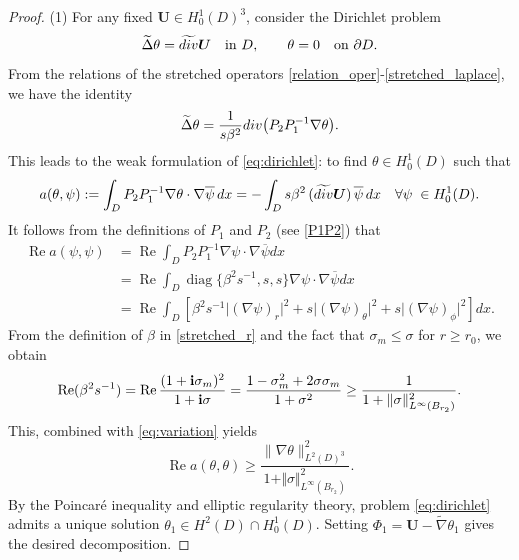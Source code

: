 \documentclass[10pt,a4paper]{amsart}
\providecommand{\Diag}{\operatorname{diag}}%
\providecommand{\Rp}{\operatorname{Re}}%
\newcommand{\bs}{\boldsymbol}
\newcommand{\dive}{{\rm div}}
\newcommand{\pa}{\partial}
\newcommand{\sig}{\sigma}
\newcommand{\wid}{\widetilde}
\begin{document}
\begin{proof}
(1) For any fixed $\bs{U}\in H_0^1(D)^3$, consider the Dirichlet problem
\begin{equation}\label{eq:dirichlet}
\wid{\Delta}\theta = \wid{\dive}\bs{U} \quad\text{in } D, \qquad \theta = 0 \quad\text{on } \pa D .
\end{equation}
From the relations of the stretched operators \eqref{relation_oper}-\eqref{stretched_laplace}, 
we have the identity
\begin{equation}
\wid{\Delta}\theta = \frac{1}{s\beta^2}\dive\bigl(P_2P_1^{-1}\nabla\theta\bigr).
\end{equation}
This leads to the weak formulation of \eqref{eq:dirichlet}: to find $\theta\in H_0^1(D)$ such that
\begin{equation*}
a(\theta,\psi):=\int_D P_2P_1^{-1}\nabla\theta\cdot\nabla\overline{\psi}\,dx
= -\int_D s\beta^2\,(\wid{\dive}\bs{U})\,\overline{\psi}\,dx
\quad \forall \psi\;\in H_0^1(D).
\end{equation*}
It follows from the definitions of $P_1$ and $P_2$ (see \eqref{P1P2}) that
\begin{equation}\label{eq:variation}
\begin{aligned}
\Rp a(\psi,\psi)&=\Rp\int_{D}P_2P_1^{-1}\nabla \psi\cdot\nabla\overline{\psi}dx \\
&= \Rp\int_{D}\Diag\{\beta^2s^{-1},s,s\}\nabla \psi\cdot\nabla\overline{\psi}dx \\
&=\Rp\int_{D}\left[\beta^2s^{-1}\vert (\nabla \psi)_r \vert^2+s\vert (\nabla \psi)_\theta\vert^2
+s\vert (\nabla \psi)_\phi \vert^2\right]dx.
\end{aligned}
\end{equation}
From the definition of $\beta$ in \eqref{stretched_r} and the fact that $\sig_m\le\sig$ for $r\ge r_0$, we obtain
\begin{equation}\label{bs_lower_bound}
\Rp(\beta^2s^{-1}) = \Rp\frac{(1+{\bf i}\sig_m)^2}{1+{\bf i}\sig} = \frac{1-\sig_m^2+2\sig\sig_m}{1+\sig^2} 
\geq \frac{1}{1+\Vert\sig\Vert_{L^{\infty}(B_{r_2})}^2}.
\end{equation}
This, combined with \eqref{eq:variation} yields
\begin{equation}\label{lowerbound_a}
\Rp a(\theta,\theta) \geq
\frac{\lVert \nabla \theta \rVert_{{L^2(D)^3}}^2}{1+\Vert\sig\Vert_{L^{\infty}(B_{r_2})}^2}.
\end{equation}
By the Poincar\'e inequality and elliptic regularity theory, problem \eqref{eq:dirichlet} 
admits a unique solution $\theta_1\in H^2(D)\cap H_0^1(D)$. Setting $\Phi_1 = \bs{U} - 
\wid{\nabla}\theta_1$ gives the desired decomposition.


\end{proof}
\end{document}
